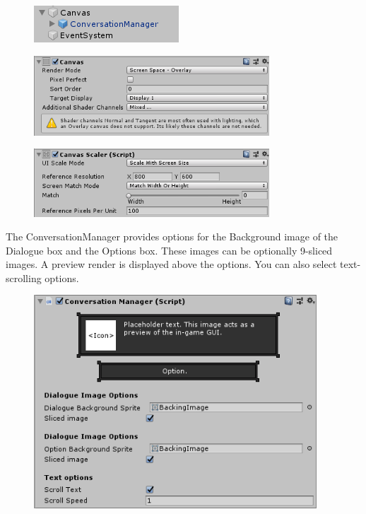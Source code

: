 \documentclass[a4paper,12pt]{article}
\begin{document}
\begin{figure}[h]
\centering
\includegraphics[keepaspectratio]{img/CanvasInHierarchy.png}
\end{figure}

\begin{figure}[h]
\centering
\includegraphics[width=250pt, keepaspectratio]{img/CanvasComponent.png}
\end{figure}


\begin{figure}[h]
\centering
\includegraphics[width=250pt, keepaspectratio]{img/CanvasScalarComponent.png}
\end{figure}

\newpage

The ConversationManager provides options for the Background image of the Dialogue box and the Options box. These images can be optionally 9-sliced images. A preview render is displayed above the options. You can also select text-scrolling options.

\begin{figure}[h]
\centering
\includegraphics[width=300pt, keepaspectratio]{img/ConversationManager.png}
\end{figure}
\end{document}
